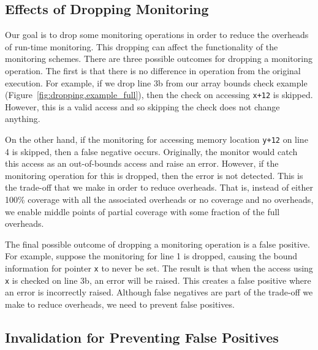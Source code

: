 \subsection{Effects of Dropping Monitoring}
\label{sec:dropping.false_neg_pos}

Our goal is to drop some monitoring operations in order to reduce the overheads
of run-time monitoring. This dropping can affect the functionality of the
monitoring schemes. There are three possible outcomes for dropping a
monitoring operation. The first is that there is no difference in operation
from the original execution. For example, if we drop line 3b from our array
bounds check example (Figure~\ref{fig:dropping.example_full}), then the
check on accessing {\tt x+12} is skipped. However, this is a valid access and so
skipping the check does not change anything.

On the other hand, if the monitoring for accessing memory location {\tt y+12} on
line 4 is skipped, then
a false negative occurs. Originally, the monitor would catch this access as an
out-of-bounds access and raise an error. However, if the monitoring operation
for this is dropped, then the error is not detected. This is the trade-off that
we make in order to reduce overheads. That is, instead of either 100\% coverage
with all the associated overheads or no coverage and no overheads, we 
enable middle points of partial coverage with some fraction of the full
overheads.

The final possible outcome of dropping a monitoring operation is a false positive. 
For example, suppose the monitoring for
line 1 is dropped, causing the bound information for pointer {\tt x} to never
be set. The result is that when the access using {\tt x} is checked on line 3b,
an error will be raised. This creates a false positive where an error is
incorrectly raised. Although false negatives are part of the trade-off we make
to reduce overheads, we need to prevent false positives.

\subsection{Invalidation for Preventing False Positives}
\label{sec:dropping.prevent_false_pos}


